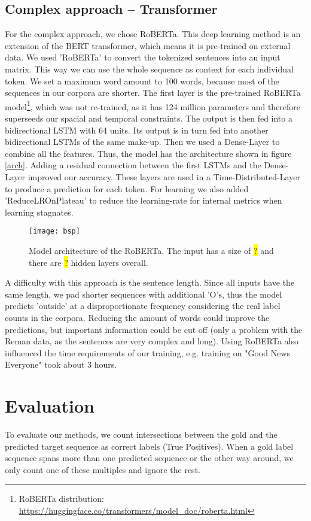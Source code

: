 \documentclass[12pt,pdftex,a4paper]{scrartcl}
\begin{document}
\subsection{Complex approach -- Transformer}
For the complex approach, we chose RoBERTa. This deep learning method is an extension of the BERT transformer, which means it is pre-trained on external data. We used 'RoBERTa' to convert the tokenized sentences into an input matrix. This way we can use the whole sequence as context for each individual token. We set a maximum word amount to 100 words, because most of the sequences in our corpora are shorter. The first layer is the pre-trained RoBERTa model\footnote{RoBERTa distribution: \url{https://huggingface.co/transformers/model_doc/roberta.html}}, which was not re-trained, as it has 124 million parameters and therefore superseeds our spacial and temporal constraints. The output is then fed into a bidirectional LSTM with 64 units. Its output is in turn fed into another bidirectional LSTMs of the same make-up. Then we used a Dense-Layer to combine all the features. Thus, the model has the architecture shown in figure \ref{arch}. Adding a residual connection between the first LSTMs and the Dense-Layer improved our accuracy. These layers are used in a Time-Distributed-Layer to produce a prediction for each token. For learning we also added 'ReduceLROnPlateau' to reduce the learning-rate for internal metrics when learning stagnates.

\begin{figure}
\centering \texttt{[image: bsp]} 

\caption{Model architecture of the RoBERTa. The input has a size of \colorbox{yellow}{?} and there are \colorbox{yellow}{?} hidden layers overall.}
\end{figure}

A difficulty with this approach is the sentence length. Since all inputs have the same length, we pad shorter sequences with additional 'O's, thus the model predicts 'outside' at a disproportionate frequency considering the real label counts in the corpora. Reducing the amount of words could improve the predictions, but important information could be cut off (only a problem with the Reman data, as the sentences are very complex and long). Using RoBERTa also influenced the time requirements of our training, e.g. training on "Good News Everyone" took about 3 hours.

\section{Evaluation}
To evaluate our methods, we count intersections between the gold and the predicted 
target sequence as correct labels (True Positives). When a gold label sequence spans more than one predicted sequence or the other way around, we only count one of these multiples and ignore the rest. 
\end{document}
